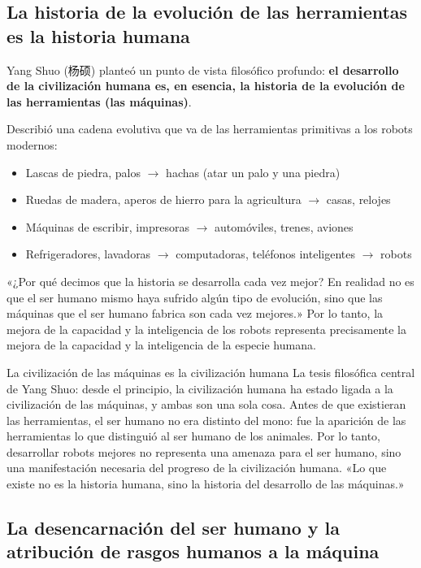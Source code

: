 \documentclass[a4paper]{article}
\begin{document}
\subsection{La historia de la evolución de las herramientas es la historia humana}

Yang Shuo (杨硕) planteó un punto de vista filosófico profundo: \textbf{el desarrollo de la civilización humana es, en esencia, la historia de la evolución de las herramientas (las máquinas)}.

Describió una cadena evolutiva que va de las herramientas primitivas a los robots modernos:
\begin{itemize}
    \item Lascas de piedra, palos $\to$ hachas (atar un palo y una piedra)
    \item Ruedas de madera, aperos de hierro para la agricultura $\to$ casas, relojes
    \item Máquinas de escribir, impresoras $\to$ automóviles, trenes, aviones
    \item Refrigeradores, lavadoras $\to$ computadoras, teléfonos inteligentes $\to$ robots
\end{itemize}

«¿Por qué decimos que la historia se desarrolla cada vez mejor? En realidad no es que el ser humano mismo haya sufrido algún tipo de evolución, sino que las máquinas que el ser humano fabrica son cada vez mejores.» Por lo tanto, la mejora de la capacidad y la inteligencia de los robots representa precisamente la mejora de la capacidad y la inteligencia de la especie humana.

\begin{importantbox}{La civilización de las máquinas es la civilización humana}
La tesis filosófica central de Yang Shuo: desde el principio, la civilización humana ha estado ligada a la civilización de las máquinas, y ambas son una sola cosa. Antes de que existieran las herramientas, el ser humano no era distinto del mono: fue la aparición de las herramientas lo que distinguió al ser humano de los animales. Por lo tanto, desarrollar robots mejores no representa una amenaza para el ser humano, sino una manifestación necesaria del progreso de la civilización humana. «Lo que existe no es la historia humana, sino la historia del desarrollo de las máquinas.»
\end{importantbox}

\subsection{La desencarnación del ser humano y la atribución de rasgos humanos a la máquina}
\end{document}
